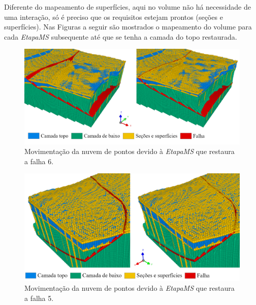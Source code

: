 Diferente do mapeamento de superfícies, aqui no volume não há necessidade de uma interação, só é preciso que os requisitos estejam prontos (seções e superfícies). Nas Figuras a seguir são mostrados o mapeamento do volume para cada \emph{EtapaMS} subsequente até que se tenha a camada do topo restaurada.

\begin{figure} [H]
  \begin{center}
    \includegraphics[width=\textwidth]{images/fig-vol-ex-4}
    \caption{Movimentação da nuvem de pontos devido à \emph{EtapaMS} que restaura a falha 6.}\label{fig-vol-ex-4}
  \end{center}
\end{figure}

\begin{figure} [H]
  \begin{center}
    \includegraphics[width=\textwidth]{images/fig-vol-ex-5}
    \caption{Movimentação da nuvem de pontos devido à \emph{EtapaMS} que restaura a falha 5.}\label{fig-vol-ex-5}
  \end{center}
\end{figure}

